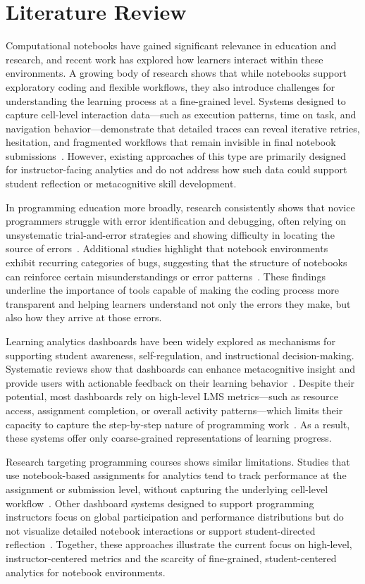 \section{Literature Review}
Computational notebooks have gained significant relevance in education and research, and recent work has explored how learners interact within these environments. A growing body of research shows that while notebooks support exploratory coding and flexible workflows, they also introduce challenges for understanding the learning process at a fine-grained level. Systems designed to capture cell-level interaction data—such as execution patterns, time on task, and navigation behavior—demonstrate that detailed traces can reveal iterative retries, hesitation, and fragmented workflows that remain invisible in final notebook submissions~\cite{cai2025jupyter}. However, existing approaches of this type are primarily designed for instructor-facing analytics and do not address how such data could support student reflection or metacognitive skill development.

In programming education more broadly, research consistently shows that novice programmers struggle with error identification and debugging, often relying on unsystematic trial-and-error strategies and showing difficulty in locating the source of errors~\cite{robinson2022error}. Additional studies highlight that notebook environments exhibit recurring categories of bugs, suggesting that the structure of notebooks can reinforce certain misunderstandings or error patterns~\cite{de2022bug}. These findings underline the importance of tools capable of making the coding process more transparent and helping learners understand not only the errors they make, but also how they arrive at those errors.

Learning analytics dashboards have been widely explored as mechanisms for supporting student awareness, self-regulation, and instructional decision-making. Systematic reviews show that dashboards can enhance metacognitive insight and provide users with actionable feedback on their learning behavior~\cite{schwendimann2016perceiving}. Despite their potential, most dashboards rely on high-level LMS metrics—such as resource access, assignment completion, or overall activity patterns—which limits their capacity to capture the step-by-step nature of programming work~\cite{paulsen2024learning}. As a result, these systems offer only coarse-grained representations of learning progress.

Research targeting programming courses shows similar limitations. Studies that use notebook-based assignments for analytics tend to track performance at the assignment or submission level, without capturing the underlying cell-level workflow~\cite{sondagar2021elearning}. Other dashboard systems designed to support programming instructors focus on global participation and performance distributions but do not visualize detailed notebook interactions or support student-directed reflection~\cite{groher2024learning}. Together, these approaches illustrate the current focus on high-level, instructor-centered metrics and the scarcity of fine-grained, student-centered analytics for notebook environments.

